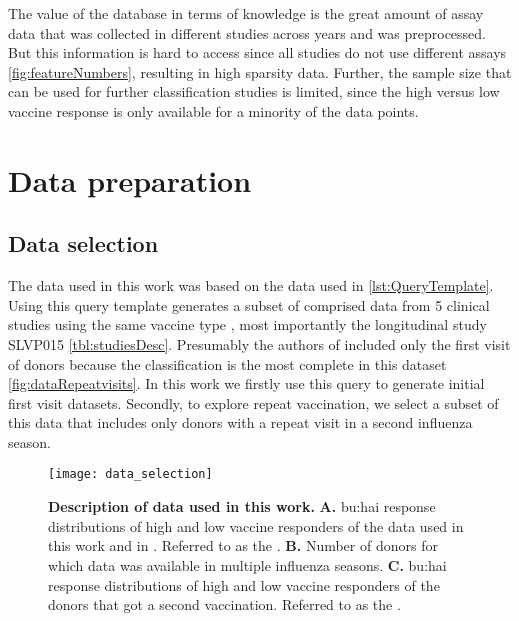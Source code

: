 The value of the database in terms of knowledge is the great amount of assay data that was collected in different studies across years and was preprocessed.
But this information is hard to access since all studies do not use different assays \autoref{fig:featureNumbers}, resulting in high sparsity data.
Further, the sample size that can be used for further classification studies is limited, since the high versus low vaccine response is only available for a minority of the data points.

\section{Data preparation}

\subsection{Data selection}

The data used in this work was based on the data used in \spaper \autoref{lst:QueryTemplate}.
Using this query template generates a subset of \flup comprised data from 5 clinical studies using the same vaccine type , most importantly the longitudinal study SLVP015 \autoref{tbl:studiesDesc}.
Presumably the authors of \spaper included only the first visit of donors because the classification is the most complete in this dataset \autoref{fig:dataRepeatvisits}.
In this work we firstly use this query to generate initial first visit datasets.
Secondly, to explore repeat vaccination, we select a subset of this data that includes only donors with a repeat visit in a second influenza season.

\begin{figure}[htpb]
    \texttt{[image: data\_selection]}
    \caption{
        \textbf{Description of data used in this work.}
        \textbf{A.} \gls{bu:hai} response distributions of high and low vaccine responders of the data used in this work and in \spaper. Referred to as the \firstvis.
        \textbf{B.} Number of donors for which data was available in multiple influenza seasons.
        \textbf{C.} \gls{bu:hai} response distributions of high and low vaccine responders of the donors that got a second vaccination. Referred to as the \secondvis.
    }\label{fig:dataRepeatvisits}
\end{figure}

